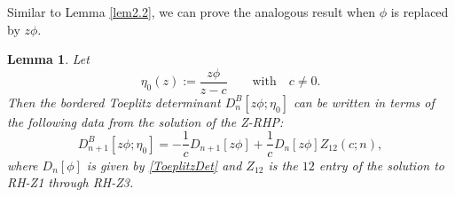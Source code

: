 \documentclass[10pt,a4paper]{amsart}
\numberwithin{equation}{section}
\newtheorem{Lemma}[Theorem]{Lemma}
 { \theoremstyle{definition}
\newtheorem{Definition}[Theorem]{Definition}
\newtheorem{Example}[Theorem]{Example}
\newtheorem{Remark}[Theorem]{Remark}
\newtheorem{Question}[Theorem]{Question}
}
\begin{document}
Similar to Lemma \ref{lem2.2}, we can prove the analogous result when $\phi$ is replaced by $z\phi$.
		
\begin{Lemma}\label{lemma zphi/z-c} Let \begin{equation*}
				\eta_0(z):= \frac{z\phi}{z-c} \qquad \mbox{with} \quad c \neq 0.
			\end{equation*} Then the bordered Toeplitz determinant $D^{B}_n[z\phi;\eta_0]$ can be written in terms of the following data from the solution of the Z-RHP:
			\begin{equation}\label{bdToep-RHP-eta0}
				D^{B}_{n+1}[z\phi;\eta_0] = - \frac{1}{c}D_{n+1}[z\phi]+ \frac{1}{c} D_{n}[z\phi] Z_{12}(c;n),
			\end{equation}
			where $D_{n}[\phi]$ is given by \eqref{ToeplitzDet} and $Z_{12}$ is the $12$ entry of the solution to {\rm RH-Z1} through {\rm RH-Z3}.
		\end{Lemma}
		
\end{document}
